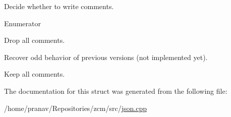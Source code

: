 Decide whether to write comments. 

\begin{Desc}
\item[Enumerator]\par
\begin{description}
\item[{\em 
None\hypertarget{structJson_1_1CommentStyle_a51fc08f3518fd81eba12f340d19a3d0cac8b32a8bae63414c8647d4919da8d437}{}\label{structJson_1_1CommentStyle_a51fc08f3518fd81eba12f340d19a3d0cac8b32a8bae63414c8647d4919da8d437}
}]Drop all comments. \item[{\em 
Most\hypertarget{structJson_1_1CommentStyle_a51fc08f3518fd81eba12f340d19a3d0cac65238f050773c107690a456e9c05c98}{}\label{structJson_1_1CommentStyle_a51fc08f3518fd81eba12f340d19a3d0cac65238f050773c107690a456e9c05c98}
}]Recover odd behavior of previous versions (not implemented yet). \item[{\em 
All\hypertarget{structJson_1_1CommentStyle_a51fc08f3518fd81eba12f340d19a3d0ca32302c0b97190c1808b3e38f367fef01}{}\label{structJson_1_1CommentStyle_a51fc08f3518fd81eba12f340d19a3d0ca32302c0b97190c1808b3e38f367fef01}
}]Keep all comments. \end{description}
\end{Desc}


The documentation for this struct was generated from the following file\+:\begin{DoxyCompactItemize}
\item 
/home/pranav/\+Repositories/zcm/src/\hyperlink{json_8cpp}{json.\+cpp}\end{DoxyCompactItemize}
